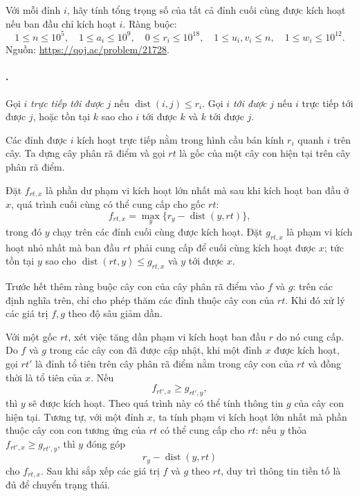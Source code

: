 \documentclass[11pt]{article}
\begin{document}
Với mỗi đỉnh \(i\), hãy tính tổng trọng số của tất cả đỉnh cuối cùng được kích
hoạt nếu ban đầu chỉ kích hoạt \(i\). Ràng buộc:
\[
  1\le n\le 10^5,\quad 1\le a_i\le 10^9,\quad
  0\le r_i\le 10^{18},\quad
  1\le u_i,v_i\le n,\quad 1\le w_i\le 10^{12}.
\]
Nguồn: \url{https://qoj.ac/problem/21728}.

\paragraph{.}
Gọi \(i\) \emph{trực tiếp tới được} \(j\) nếu
\(\operatorname{dist}(i,j)\le r_i\). Gọi \(i\) \emph{tới được} \(j\) nếu
\(i\) trực tiếp tới được \(j\), hoặc tồn tại \(k\) sao cho \(i\) tới được
\(k\) và \(k\) tới được \(j\).

Các đỉnh được \(i\) kích hoạt trực tiếp nằm trong hình cầu bán kính \(r_i\)
quanh \(i\) trên cây. Ta dựng cây phân rã điểm và gọi \(rt\) là gốc của một
cây con hiện tại trên cây phân rã điểm.

Đặt \(f_{rt,x}\) là phần dư phạm vi kích hoạt lớn nhất mà sau khi kích hoạt
ban đầu ở \(x\), quá trình cuối cùng có thể cung cấp cho gốc \(rt\):
\[
  f_{rt,x}=\max_y\{r_y-\operatorname{dist}(y,rt)\},
\]
trong đó \(y\) chạy trên các đỉnh cuối cùng được kích hoạt. Đặt \(g_{rt,x}\)
là phạm vi kích hoạt nhỏ nhất mà ban đầu \(rt\) phải cung cấp để cuối cùng
kích hoạt được \(x\); tức tồn tại \(y\) sao cho
\(\operatorname{dist}(rt,y)\le g_{rt,x}\) và \(y\) tới được \(x\).

Trước hết thêm ràng buộc cây con của cây phân rã điểm vào \(f\) và \(g\): trên
các định nghĩa trên, chỉ cho phép thăm các đỉnh thuộc cây con của \(rt\). Khi
đó xử lý các giá trị \(f,g\) theo độ sâu giảm dần.

Với một gốc \(rt\), xét việc tăng dần phạm vi kích hoạt ban đầu \(r\) do nó
cung cấp. Do \(f\) và \(g\) trong các cây con đã được cập nhật, khi một đỉnh
\(x\) được kích hoạt, gọi \(rt'\) là đỉnh tổ tiên trên cây phân rã điểm nằm
trong cây con của \(rt\) và đồng thời là tổ tiên của \(x\). Nếu
\[
  f_{rt',x}\ge g_{rt',y},
\]
thì \(y\) sẽ được kích hoạt. Theo quá trình này có thể tính thông tin \(g\)
của cây con hiện tại. Tương tự, với một đỉnh \(x\), ta tính phạm vi kích hoạt
lớn nhất mà phần thuộc cây con con tương ứng của \(rt\) có thể cung cấp cho
\(rt\): nếu \(y\) thỏa \(f_{rt',x}\ge g_{rt',y}\), thì \(y\) đóng góp
\[
  r_y-\operatorname{dist}(y,rt)
\]
cho \(f_{rt,x}\). Sau khi sắp xếp các giá trị \(f\) và \(g\) theo \(rt\), duy
trì thông tin tiền tố là đủ để chuyển trạng thái.
\end{document}
